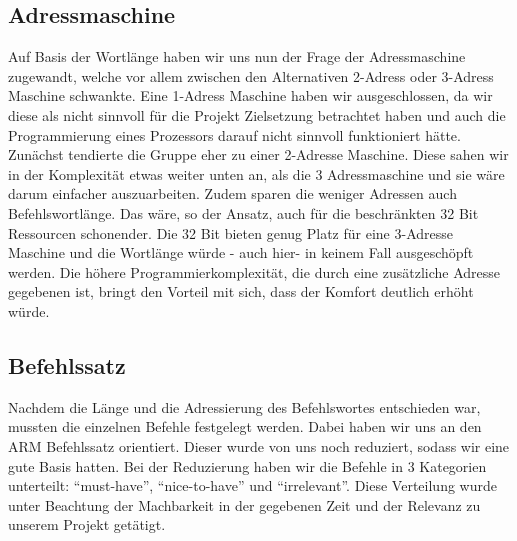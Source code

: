 \documentclass[paper=a4,fontsize=12pt,twocolumn]{scrreprt}
\begin{document}
\subsection{Adressmaschine}
Auf Basis der Wortlänge haben wir uns nun der Frage der Adressmaschine zugewandt, welche vor allem zwischen den Alternativen 2-Adress oder 3-Adress Maschine schwankte.
Eine 1-Adress Maschine haben wir ausgeschlossen, da wir diese als nicht sinnvoll für die Projekt Zielsetzung betrachtet haben und auch die Programmierung eines Prozessors darauf nicht sinnvoll funktioniert hätte. %
Zunächst tendierte die Gruppe eher zu einer 2-Adresse Maschine.
Diese sahen wir in der Komplexität etwas weiter unten an, als die 3 Adressmaschine und sie wäre darum einfacher auszuarbeiten.
Zudem sparen die weniger Adressen auch Befehlswortlänge.
Das wäre, so der Ansatz, auch für die beschränkten 32 Bit Ressourcen schonender.
Die 32 Bit bieten genug Platz für eine 3-Adresse Maschine und die Wortlänge würde - auch hier- in keinem Fall ausgeschöpft werden.
Die höhere Programmierkomplexität, die durch eine zusätzliche Adresse gegebenen ist, bringt den Vorteil mit sich, dass der Komfort deutlich erhöht würde.

\subsection{Befehlssatz}

Nachdem die Länge und die Adressierung des Befehlswortes entschieden war, mussten die einzelnen Befehle festgelegt werden.
Dabei haben wir uns an den ARM Befehlssatz orientiert\footnotemark.
Dieser wurde von uns noch reduziert, sodass wir eine gute Basis hatten.
Bei der Reduzierung haben wir die Befehle in 3 Kategorien unterteilt: \enquote{must-have}, \enquote{nice-to-have} und \enquote{irrelevant}.
Diese Verteilung wurde unter Beachtung der Machbarkeit in der gegebenen Zeit und der Relevanz zu unserem Projekt getätigt.
\end{document}
